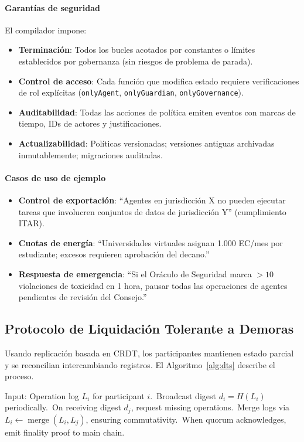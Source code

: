 \documentclass[11pt]{article}
\begin{document}
\paragraph{Garantías de seguridad} El compilador impone:
\begin{itemize}[noitemsep]
  \item \textbf{Terminación}: Todos los bucles acotados por constantes o límites establecidos por gobernanza (sin riesgos de problema de parada).
  \item \textbf{Control de acceso}: Cada función que modifica estado requiere verificaciones de rol explícitas (\texttt{onlyAgent}, \texttt{onlyGuardian}, \texttt{onlyGovernance}).
  \item \textbf{Auditabilidad}: Todas las acciones de política emiten eventos con marcas de tiempo, IDs de actores y justificaciones.
  \item \textbf{Actualizabilidad}: Políticas versionadas; versiones antiguas archivadas inmutablemente; migraciones auditadas.
\end{itemize}

\paragraph{Casos de uso de ejemplo}
\begin{itemize}[noitemsep]
  \item \textbf{Control de exportación}: ``Agentes en jurisdicción X no pueden ejecutar tareas que involucren conjuntos de datos de jurisdicción Y'' (cumplimiento ITAR).
  \item \textbf{Cuotas de energía}: ``Universidades virtuales asignan 1.000 EC/mes por estudiante; excesos requieren aprobación del decano.''
  \item \textbf{Respuesta de emergencia}: ``Si el Oráculo de Seguridad marca $>10$ violaciones de toxicidad en 1 hora, pausar todas las operaciones de agentes pendientes de revisión del Consejo.''
\end{itemize}

\subsection{Protocolo de Liquidación Tolerante a Demoras}
Usando replicación basada en CRDT, los participantes mantienen estado parcial y se reconcilian intercambiando registros. El Algoritmo~\ref{alg:dts} describe el proceso.

\begin{algorithm}[H]
  \caption{Delay-Tolerant Settlement (DTS)}
  \label{alg:dts}
  \begin{algorithmic}[1]
    \STATE Input: Operation log $L_i$ for participant $i$.\
    \STATE Broadcast digest $d_i = H(L_i)$ periodically.\
    \STATE On receiving digest $d_j$, request missing operations.\
    \STATE Merge logs via $L_i \leftarrow \operatorname{merge}(L_i, L_j)$, ensuring commutativity.\
    \STATE When quorum acknowledges, emit finality proof to main chain.\
  \end{algorithmic}
\end{algorithm}
\end{document}
